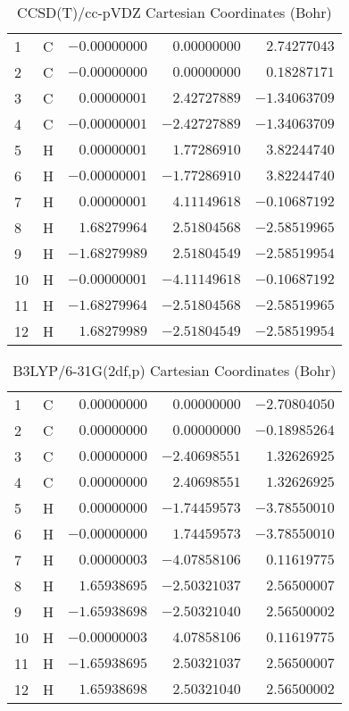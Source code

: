 \documentclass[10pt,oneside]{article}
\begin{document}
\begin{table}[h!]
\centering
\caption{CCSD(T)/cc-pVDZ Cartesian Coordinates (Bohr)}
\begin{tabular}{llrrr}
1  & C  & $-0.00000000$ & $ 0.00000000$ & $ 2.74277043$ \\
2  & C  & $-0.00000000$ & $ 0.00000000$ & $ 0.18287171$ \\
3  & C  & $ 0.00000001$ & $ 2.42727889$ & $-1.34063709$ \\
4  & C  & $-0.00000001$ & $-2.42727889$ & $-1.34063709$ \\
5  & H  & $ 0.00000001$ & $ 1.77286910$ & $ 3.82244740$ \\
6  & H  & $-0.00000001$ & $-1.77286910$ & $ 3.82244740$ \\
7  & H  & $ 0.00000001$ & $ 4.11149618$ & $-0.10687192$ \\
8  & H  & $ 1.68279964$ & $ 2.51804568$ & $-2.58519965$ \\
9  & H  & $-1.68279989$ & $ 2.51804549$ & $-2.58519954$ \\
10 & H  & $-0.00000001$ & $-4.11149618$ & $-0.10687192$ \\
11 & H  & $-1.68279964$ & $-2.51804568$ & $-2.58519965$ \\
12 & H  & $ 1.68279989$ & $-2.51804549$ & $-2.58519954$ \\
\end{tabular}
\end{table}

\begin{table}[h!]
\centering
\caption{B3LYP/6-31G(2df,p) Cartesian Coordinates (Bohr)}
\begin{tabular}{llrrr}
1  & C  & $ 0.00000000$ & $ 0.00000000$ & $-2.70804050$ \\
2  & C  & $ 0.00000000$ & $ 0.00000000$ & $-0.18985264$ \\
3  & C  & $ 0.00000000$ & $-2.40698551$ & $ 1.32626925$ \\
4  & C  & $ 0.00000000$ & $ 2.40698551$ & $ 1.32626925$ \\
5  & H  & $ 0.00000000$ & $-1.74459573$ & $-3.78550010$ \\
6  & H  & $-0.00000000$ & $ 1.74459573$ & $-3.78550010$ \\
7  & H  & $ 0.00000003$ & $-4.07858106$ & $ 0.11619775$ \\
8  & H  & $ 1.65938695$ & $-2.50321037$ & $ 2.56500007$ \\
9  & H  & $-1.65938698$ & $-2.50321040$ & $ 2.56500002$ \\
10 & H  & $-0.00000003$ & $ 4.07858106$ & $ 0.11619775$ \\
11 & H  & $-1.65938695$ & $ 2.50321037$ & $ 2.56500007$ \\
12 & H  & $ 1.65938698$ & $ 2.50321040$ & $ 2.56500002$ \\
\end{tabular}
\end{table}
\end{document}
